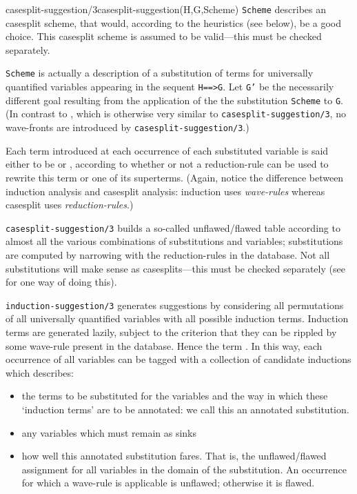 \begin{predicate}{casesplit-suggestion/3}{casesplit-suggestion(H,G,Scheme)}%
{\tt Scheme} describes an casesplit scheme, that would, according to
the heuristics (see below), be a good choice.  This casesplit scheme
is assumed to be valid---this must be checked separately.  

{\tt Scheme} is actually a description of a substitution of terms for
universally quantified variables appearing in the sequent {\tt H==>G}.
Let {\tt G'} be the necessarily different goal resulting from the
application of the the substitution {\tt Scheme} to {\tt G}.  (In
contrast to , which is otherwise very
similar to {\tt casesplit-suggestion/3}, no wave-fronts are
introduced by {\tt casesplit-suggestion/3}.)

Each term introduced at each occurrence of each substituted variable
is said either to be {\em{}\/} or {\em{}},
according to whether or not a reduction-rule can be used to rewrite
this term or one of its superterms.  (Again, notice the difference
between induction analysis and casesplit analysis: induction uses {\em
wave-rules\/} whereas casesplit uses {\em reduction-rules}.)

{\tt casesplit-suggestion/3} builds a so-called unflawed/flawed table
according to almost all the various combinations of substitutions and
variables; substitutions are computed by narrowing with the
reduction-rules in the database.  Not all substitutions will make sense
as casesplits---this must be checked separately (see  for
one way of doing this).

{\tt induction-suggestion/3} generates suggestions by considering all
permutations of all universally quantified variables with all possible
induction terms.  Induction terms are generated lazily, subject to
the criterion that they can be rippled by some wave-rule present in
the database.  Hence the term {\em{}}.  In this way,
each occurrence of all variables can  be tagged with a collection of
candidate inductions which describes:
\begin{itemize}
\item
 the terms to be substituted for the variables and the way in which
 these  `induction terms' are to be annotated: we call this an
 annotated substitution.
\item any variables which must remain as sinks
\item how well this annotated substitution fares.  That is, the
 unflawed/flawed assignment for all variables in the domain of the
substitution.  An occurrence for which a wave-rule is applicable is
unflawed; otherwise it is flawed.
\end{itemize}



\end{predicate}
